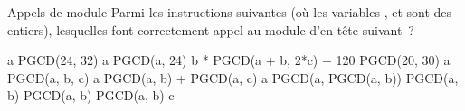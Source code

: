\begin{Exercice}{Appels de module}
	Parmi les instructions suivantes (où les variables
	,  et 
	sont des entiers), lesquelles font correctement appel au module
	d’en-tête suivant~?

	\begin{Pseudocode}
	\end{Pseudocode}

	\begin{Pseudocode}
	\Stmt [1] a \Gets PGCD(24, 32)
	\Stmt [2] a \Gets PGCD(a, 24)
	\Stmt [3] b  PGCD(a + b, 2*c) + 120
	\Stmt [4] PGCD(20, 30)
	\Stmt [5] a \Gets PGCD(a, b, c)
	\Stmt [6] a \Gets PGCD(a, b) + PGCD(a, c)
	\Stmt [7] a \Gets PGCD(a, PGCD(a, b))
	\Stmt [8]  PGCD(a, b)
	\Stmt [9]  PGCD(a, b)
	\Stmt [10] PGCD(a, b) \Gets c
	\end{Pseudocode}
\end{Exercice}

